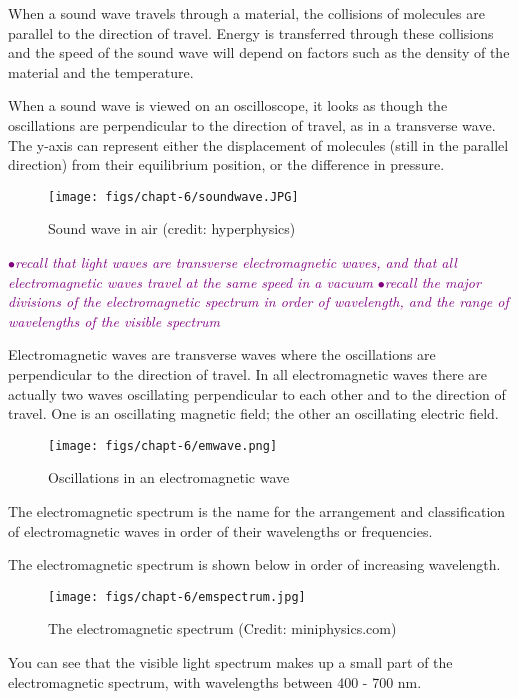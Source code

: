 \documentclass[a4paper,11pt,twoside]{memoir}
\newcounter{spec}[chapter]
\newcommand{\spec}[1]{\Needspace{5\baselineskip}\textcolor{purple}{$\bullet$\hspace{0.5cm}\textit{#1}}}
\begin{document}
When a sound wave travels through a material, the collisions of molecules are parallel to the direction of travel. Energy is transferred through these collisions and the speed of the sound wave will depend on factors such as the density of the material and the temperature.

When a sound wave is viewed on an oscilloscope, it looks as though the oscillations are perpendicular to the direction of travel, as in a transverse wave. The y-axis can represent either the displacement of molecules (still in the parallel direction) from their equilibrium position, or the difference in pressure.

\begin{figure}[h]
\texttt{[image: figs/chapt-6/soundwave.JPG]}
\caption{Sound wave in air (credit: hyperphysics)}
\label{Sound wave in air}
\end{figure}

\spec{recall that light waves are transverse electromagnetic waves, and that all electromagnetic waves travel at the same speed in a vacuum}
\spec{recall the major divisions of the electromagnetic spectrum in order of wavelength, and the range of wavelengths of the visible spectrum}

Electromagnetic waves are transverse waves where the oscillations are perpendicular to the direction of travel. In all electromagnetic waves there are actually two waves oscillating perpendicular to each other and to the direction of travel. One is an oscillating magnetic field; the other an oscillating electric field.

\begin{figure}[h!]
\texttt{[image: figs/chapt-6/emwave.png]}
\centering
\caption{Oscillations in an electromagnetic wave}
\label{emwave}
\end{figure}

The electromagnetic spectrum is the name for the arrangement and classification of electromagnetic waves in order of their wavelengths or frequencies.

The electromagnetic spectrum is shown below in order of increasing wavelength.

\begin{figure}[h]
\texttt{[image: figs/chapt-6/emspectrum.jpg]}
\caption{The electromagnetic spectrum (Credit: miniphysics.com)}
\end{figure}

You can see that the visible light spectrum makes up a small part of the electromagnetic spectrum, with wavelengths between 400 - 700 nm.
\end{document}
